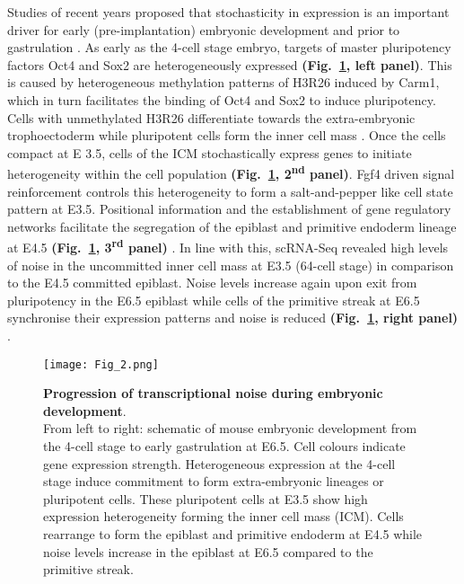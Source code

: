 Studies of recent years proposed that stochasticity in expression is an important driver for early (pre-implantation) embryonic development and prior to gastrulation \citep{Dietrich2007}. As early as the 4-cell stage embryo, targets of master pluripotency factors \gls{Oct4} and \gls{Sox2} are heterogeneously expressed \textbf{(Fig.~\ref{fig0:noise_development}, left panel)}. This is caused by heterogeneous methylation patterns of \gls{H3R26} induced by \gls{Carm1}, which in turn facilitates the binding of Oct4 and Sox2 to induce pluripotency. Cells with unmethylated H3R26 differentiate towards the extra-embryonic trophoectoderm while pluripotent cells form the inner cell mass \citep{Goolam2016}. Once the cells compact at \gls{E} 3.5, cells of the \gls{ICM} stochastically express genes to initiate heterogeneity within the cell population \textbf{(Fig.~\ref{fig0:noise_development}, 2\textsuperscript{nd} panel)}. Fgf4 driven signal reinforcement controls this heterogeneity to form a salt-and-pepper like cell state pattern at E3.5. Positional information and the establishment of gene regulatory networks facilitate the segregation of the epiblast and primitive endoderm lineage at E4.5 \textbf{(Fig.~\ref{fig0:noise_development}, 3\textsuperscript{rd} panel)} \citep{Ohnishi2014}. In line with this, scRNA-Seq revealed high levels of noise in the uncommitted inner cell mass at E3.5 (64-cell stage) in comparison to the E4.5 committed epiblast. Noise levels increase again upon exit from pluripotency in the E6.5 epiblast while cells of the primitive streak at E6.5 synchronise their expression patterns and noise is reduced \textbf{(Fig.~\ref{fig0:noise_development}, right panel)} \citep{Mohammed2017}.

\begin{figure}[!h]
\centering
\texttt{[image: Fig\_2.png]}
\caption[Progression of transcriptional heterogeneity during embryonic development]{\textbf{Progression of transcriptional noise during embryonic development}.\\
From left to right: schematic of mouse embryonic development from the 4-cell stage to early gastrulation at E6.5. Cell colours indicate gene expression strength. Heterogeneous expression at the 4-cell stage induce commitment to form extra-embryonic lineages or pluripotent cells. These pluripotent cells at E3.5 show high expression heterogeneity forming the inner cell mass (ICM). Cells rearrange to form the epiblast and primitive endoderm at E4.5 while noise levels increase in the epiblast at E6.5 compared to the primitive streak.}
\label{fig0:noise_development}
\end{figure}

